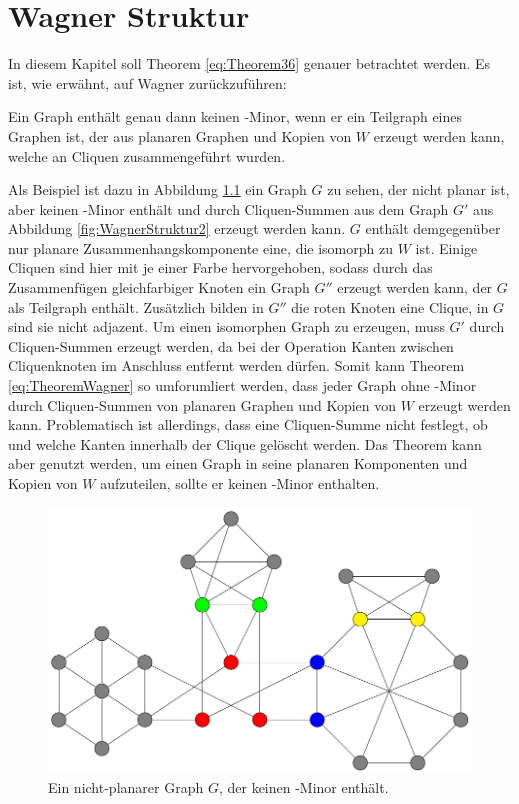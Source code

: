 \chapter{Wagner Struktur}
\label{cha:wagnerstruktur}

In diesem Kapitel soll Theorem \ref{eq:Theorem36} genauer betrachtet werden.
Es ist, wie erwähnt, auf Wagner zurückzuführen:
\begin{theorem}\label{eq:TheoremWagner}
  Ein Graph enthält genau dann keinen \kf-Minor, wenn er ein Teilgraph eines Graphen ist, der aus planaren Graphen und Kopien von $W$ erzeugt werden kann, welche an Cliquen zusammengeführt wurden.\cite{Wag37}
\end{theorem}
Als Beispiel ist dazu in Abbildung \ref{fig:WagnerStruktur1} ein Graph $G$ zu sehen, der nicht planar ist, aber keinen \kf-Minor enthält und durch Cliquen-Summen aus dem Graph $G'$ aus Abbildung \ref{fig:WagnerStruktur2} erzeugt werden kann.
$G$ enthält demgegenüber nur planare Zusammenhangskomponente \bzw eine, die isomorph zu $W$ ist.
Einige Cliquen sind hier mit je einer Farbe hervorgehoben, sodass durch das Zusammenfügen gleichfarbiger Knoten ein Graph $G''$ erzeugt werden kann, der $G$ als Teilgraph enthält.
Zusätzlich bilden in $G''$ die roten Knoten eine Clique, in $G$ sind sie nicht adjazent.
Um einen isomorphen Graph zu erzeugen, muss $G'$ durch Cliquen-Summen erzeugt werden, da bei der Operation Kanten zwischen Cliquenknoten im Anschluss entfernt werden dürfen.
Somit kann Theorem \ref{eq:TheoremWagner} so umforumliert werden, dass jeder Graph ohne \kf-Minor durch Cliquen-Summen von planaren Graphen und Kopien von $W$ erzeugt werden kann.
Problematisch ist allerdings, dass eine Cliquen-Summe nicht festlegt, ob und welche Kanten innerhalb der Clique gelöscht werden.
Das Theorem kann aber genutzt werden, um einen Graph in seine planaren Komponenten und Kopien von $W$ aufzuteilen, sollte er keinen \kf-Minor enthalten.

\begin{figure}[H]
  \centering
  \includegraphics[width=\textwidth,height=\textheight,keepaspectratio]{bilder/WagnerTheorem1.pdf}
  \caption{Ein nicht-planarer Graph $G$, der keinen \kf-Minor enthält.}
  \label{fig:WagnerStruktur1}
\end{figure}

